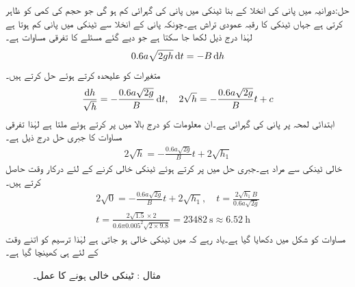 حل:دورانیہ  میں پانی کی انخلا کے بنا ٹینکی میں پانی کی گہرائی  کم ہو گی جو  حجم کی کمی کو ظاہر کرتی ہے جہاں  ٹینکی کا رقبہ عمودی تراش ہے۔چونکہ پانی کے انخلا سے ٹینکی میں پانی کم ہوتا ہے لہٰذا درج ذیل لکھا جا سکتا ہے جو دیے گئے مسئلے کا تفرقی مساوات ہے۔
\begin{align}
0.6a\sqrt{2gh} \dif t=-B\dif h
\end{align}
متغیرات کو علیحدہ کرتے ہوئے حل کرتے ہیں۔
\begin{align*}
\frac{\dif h}{\sqrt{h}}=-\frac{0.6a \sqrt{2g}}{B} \dif t,\quad 2\sqrt{h}=-\frac{0.6a \sqrt{2g}}{B} t+c
\end{align*}
ابتدائی لمحہ  پر پانی کی گہرائی  ہے۔ان معلومات کو درج بالا میں پر کرتے ہوئے  ملتا ہے لہٰذا تفرقی مساوات کا جبری حل درج ذیل ہے۔
\begin{align}\label{مساوات_سادہ_اول_ٹاری_سلی_ٹینکی_خالی}
 2\sqrt{h}=-\frac{0.6a \sqrt{2g}}{B} t+ 2\sqrt{h_1}
\end{align}
خالی ٹینکی سے مراد  ہے۔جبری حل میں  پر کرتے ہوئے ٹینکی خالی کرنے کے لئے درکار وقت حاصل کرتے ہیں۔
\begin{align*}
 2\sqrt{0}=-\frac{0.6a \sqrt{2g}}{B} t+ 2\sqrt{h_1}, \quad t=\frac{2\sqrt{h_1} B}{0.6a \sqrt{2g}}\\
t=\frac{2\sqrt{1.5} \times 2}{0.6\pi 0.005^2 \sqrt{2\times 9.8}}=\SI{23482}{\second} \approx \SI{6.52}{\hour}
\end{align*}
مساوات  کو شکل  میں دکھایا گیا ہے۔یاد رہے کہ  میں ٹینکی خالی ہو جاتی ہے لہٰذا ترسیم کو اتنے وقت کے لئے ہی کھینچا گیا ہے۔
\begin{figure}
\centering
{}
\caption{مثال : ٹینکی خالی ہونے کا عمل۔}
\label{شکل_مثال_سادہ_اول_ٹاری_سلی_خالی}
\end{figure}

